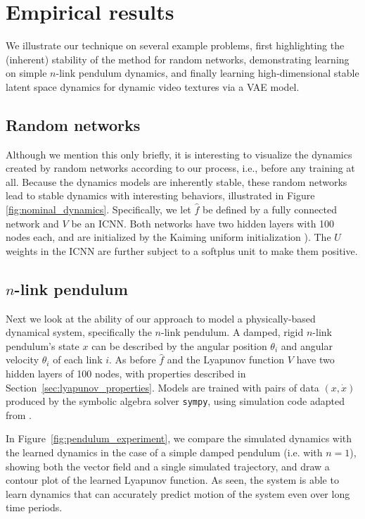 \section{Empirical results}

We illustrate our technique on several example problems, first highlighting the (inherent) stability of the method for random networks, demonstrating learning on simple $n$-link pendulum dynamics, and finally learning high-dimensional stable latent space dynamics for dynamic video textures via a VAE model.

\subsection{Random networks}



Although we mention this only briefly, it is interesting to visualize the dynamics created by random networks according to our process, i.e., before any training at all. Because the dynamics models are inherently stable, these random networks lead to stable dynamics with interesting behaviors, illustrated in Figure \ref{fig:nominal_dynamics}.  Specifically, we let $\hat{f}$ be defined by a fully connected network and $V$ be an ICNN. Both networks have two hidden layers with 100 nodes each, and are initialized by the Kaiming uniform initialization \citep{he2015delving}). The $U$ weights in the ICNN are further subject to a softplus unit to make them positive.

\subsection[n-link pendulum]{$n$-link pendulum}

Next we look at the ability of our approach to model a physically-based dynamical system, specifically the $n$-link pendulum.  A damped, rigid $n$-link pendulum's state $x$ can be described by the angular position $\theta_i$ and angular velocity $\theta_i$ of each link $i$.  As before $\hat f$ and the Lyapunov function $V$ have two hidden layers of 100 nodes, with properties described in Section~\ref{sec:lyapunov_properties}. Models are trained with pairs of data $(x, \dot x)$ produced by the symbolic algebra solver \texttt{sympy}, using simulation code adapted from \cite{vanderplas_2017}.



In Figure~\ref{fig:pendulum_experiment}, we compare the simulated dynamics with the learned dynamics in the case of a simple damped pendulum (i.e. with $n=1$), showing both the vector field and a single simulated trajectory, and draw a contour plot of the learned Lyapunov function. As seen, the system is able to learn dynamics that can accurately predict motion of the system even over long time periods.

